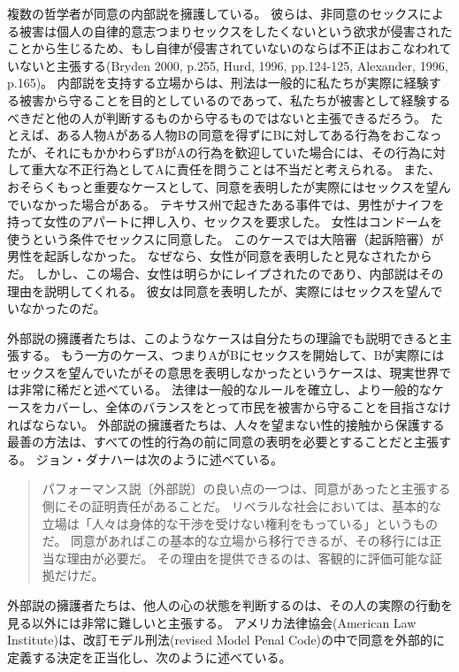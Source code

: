\documentclass[paper=a4,book,openany]{jlreq} \usepackage{mystyle}
\begin{document}
複数の哲学者が同意の内部説を擁護している。
彼らは、非同意のセックスによる被害は個人の自律的意志{\DDASH}つまりセックスをしたくないという欲求{\DDASH}が侵害されたことから生じるため、もし自律が侵害されていないのならば不正はおこなわれていないと主張する(Bryden 2000, p.255, Hurd, 1996, pp.124-125, Alexander, 1996, p.165)。
\nocite{bryden00:_redef_rape}\nocite{hurd96:_moral_magic_consen}\nocite{alexander96:_moral_magic_consen_ii}
内部説を支持する立場からは、刑法は一般的に私たちが実際に経験する被害から守ることを目的としているのであって、私たちが被害として経験するべきだと他の人が判断するものから守るものではないと主張できるだろう。
たとえば、ある人物Aがある人物Bの同意を得ずにBに対してある行為をおこなったが、それにもかかわらずBがAの行為を歓迎していた場合には、その行為に対して重大な不正行為としてAに責任を問うことは不当だと考えられる。
また、おそらくもっと重要なケースとして、同意を表明したが実際にはセックスを望んでいなかった場合がある。
テキサス州で起きたある事件では、男性がナイフを持って女性のアパートに押し入り、セックスを要求した。
女性はコンドームを使うという条件でセックスに同意した。
このケースでは大陪審（起訴陪審）が男性を起訴しなかった。
なぜなら、女性が同意を表明したと見なされたからだ。
しかし、この場合、女性は明らかにレイプされたのであり、内部説はその理由を説明してくれる。
彼女は同意を表明したが、実際にはセックスを望んでいなかったのだ\citep[cf.][p.137]{hurd96:_moral_magic_consen}。

外部説の擁護者たちは、このようなケースは自分たちの理論でも説明できると主張する。
もう一方のケース、つまりAがBにセックスを開始して、Bが実際にはセックスを望んでいたがその意思を表明しなかったというケースは、現実世界では非常に稀だと述べている。
法律は一般的なルールを確立し、より一般的なケースをカバーし、全体のバランスをとって市民を被害から守ることを目指さなければならない。
外部説の擁護者たちは、人々を望まない性的接触から保護する最善の方法は、すべての性的行為の前に同意の表明を必要とすることだと主張する。
ジョン・ダナハーは次のように述べている。

\begin{quote}
  パフォーマンス説〔外部説〕の良い点の一つは、同意があったと主張する側にその証明責任があることだ。
リベラルな社会においては、基本的な立場は「人々は身体的な干渉を受けない権利をもっている」というものだ。
同意があればこの基本的な立場から移行できるが、その移行には正当な理由が必要だ。
その理由を提供できるのは、客観的に評価可能な証拠だけだ。
\citep{danaher13:_some_notes_consen_sexual_offen_part_one}
\end{quote}

外部説の擁護者たちは、他人の心の状態を判断するのは、その人の実際の行動を見る以外には非常に難しいと主張する。
アメリカ法律協会(American Law Institute)は、改訂モデル刑法(revised Model Penal Code)の中で同意を外部的に定義する決定を正当化し、次のように述べている。
\end{document}
